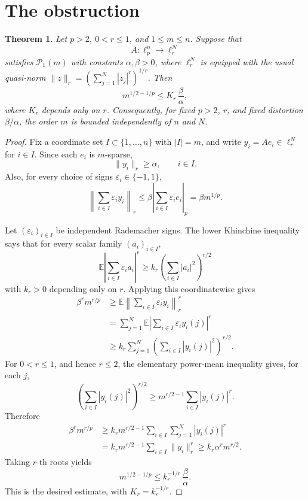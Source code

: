 \documentclass[11pt]{article}
\newtheorem{theorem}{Theorem}
\newcommand{\E}{\mathbb E}
\begin{document}
\section{The obstruction}

\begin{theorem}\label{thm:lr}
Let \(p>2\), \(0<r\le1\), and \(1\le m\le n\).  Suppose that
\[
  A:\ell_p^n\longrightarrow \ell_r^N
\]
satisfies \(\mathcal P_1(m)\) with constants \(\alpha,\beta>0\), where
\(\ell_r^N\) is equipped with the usual quasi-norm
\(\|z\|_r=(\sum_{j=1}^N |z_j|^r)^{1/r}\).  Then
\[
  m^{1/2-1/p}\le K_r\,\frac{\beta}{\alpha},
\]
where \(K_r\) depends only on \(r\).  Consequently, for fixed \(p>2\), \(r\),
and fixed distortion \(\beta/\alpha\), the order \(m\) is bounded independently
of \(n\) and \(N\).
\end{theorem}

\begin{proof}
Fix a coordinate set \(I\subset\{1,\ldots,n\}\) with \(|I|=m\), and write
\(y_i=Ae_i\in\ell_r^N\) for \(i\in I\).  Since each \(e_i\) is
\(m\)-sparse,
\[
  \|y_i\|_r\ge \alpha,\qquad i\in I.
\]
Also, for every choice of signs \(\varepsilon_i\in\{-1,1\}\),
\[
  \left\|\sum_{i\in I}\varepsilon_i y_i\right\|_r
  \le \beta \left|\sum_{i\in I}\varepsilon_i e_i\right|_p
  = \beta m^{1/p}.
\]

Let \((\varepsilon_i)_{i\in I}\) be independent Rademacher signs.  The lower
Khinchine inequality says that for every scalar family \((a_i)_{i\in I}\),
\[
  \E\left|\sum_{i\in I}\varepsilon_i a_i\right|^r
  \ge k_r\left(\sum_{i\in I}|a_i|^2\right)^{r/2}
\]
with \(k_r>0\) depending only on \(r\).  Applying this coordinatewise gives
\[
\begin{aligned}
  \beta^r m^{r/p}
  &\ge
  \E\left\|\sum_{i\in I}\varepsilon_i y_i\right\|_r^r  \\
  &= \sum_{j=1}^N
     \E\left|\sum_{i\in I}\varepsilon_i y_i(j)\right|^r \\
  &\ge
     k_r\sum_{j=1}^N
       \left(\sum_{i\in I}|y_i(j)|^2\right)^{r/2}.
\end{aligned}
\]
For \(0<r\le1\), and hence \(r\le2\), the elementary power-mean inequality
gives, for each \(j\),
\[
  \left(\sum_{i\in I}|y_i(j)|^2\right)^{r/2}
  \ge m^{r/2-1}\sum_{i\in I}|y_i(j)|^r.
\]
Therefore
\[
\begin{aligned}
  \beta^r m^{r/p}
  &\ge k_r m^{r/2-1}
       \sum_{i\in I}\sum_{j=1}^N |y_i(j)|^r  \\
  &= k_r m^{r/2-1}\sum_{i\in I}\|y_i\|_r^r
   \ge k_r \alpha^r m^{r/2}.
\end{aligned}
\]
Taking \(r\)-th roots yields
\[
  m^{1/2-1/p}\le k_r^{-1/r}\,\frac{\beta}{\alpha}.
\]
This is the desired estimate, with \(K_r=k_r^{-1/r}\).
\end{proof}
\end{document}

